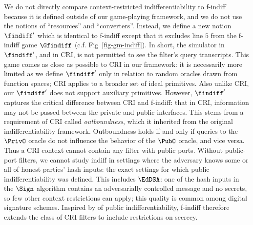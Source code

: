We do not directly compare context-restricted indifferentiability to f-indiff because it is defined outside of our game-playing framework, and we do not use the notions of ``resources'' and ``converters''.
Instead, we define a new notion $\findiff'$ which is identical to f-indiff except that it excludes line $5$ from the f-indiff game $\Gfindiff$ (c.f. Fig~\ref{fig-gm-indiff}).
In short, the simulator in $\findiff'$, and in CRI, is not permitted to see the filter's query transcripts.
This game comes as close as possible to CRI in our framework: it is necessarily more limited as we define $\findiff'$ only in relation to random oracles drawn from function spaces; CRI applies to a broader set of ideal primitives.
Also unlike CRI, our $\findiff'$ does not support auxiliary primitives.
However, $\findiff'$ captures the critical difference between CRI and f-indiff: that in CRI, information may not be passed between the private and public interfaces.
This stems from a requirement of CRI called \textit{outboundness}, which it inherited from the original indifferentiability framework.
Outboundness holds if and only if queries to the $\PrivO$ oracle do not influence the behavior of the $\PubO$ oracle, and vice versa.
Thus a CRI context cannot contain any filter with public ports.
Without public-port filters, we cannot study indiff in settings where the adversary knows some or all of honest parties' hash inputs: the exact settings for which public indifferentiability was defined.
This includes $\EdDSA$: one of the hash inputs in the $\Sign$ algorithm contains an adversarially controlled message and no secrets, so few other context restrictions can apply; this quality is common among digital signature schemes.
Inspired by of public indifferentiability, f-indiff therefore extends the class of CRI filters to include restrictions on secrecy.




